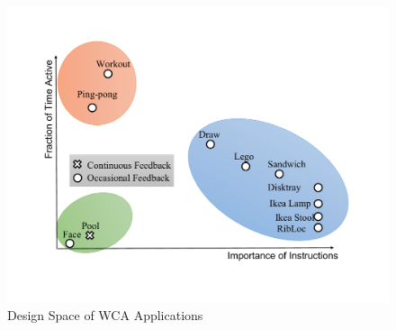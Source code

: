 \begin{figure}[]
    \centering
\includegraphics[width=\linewidth]{FIGS/fig-design-space.pdf}
    \caption{\small Design Space of WCA Applications}
    \label{figs:design-space}
\end{figure}
